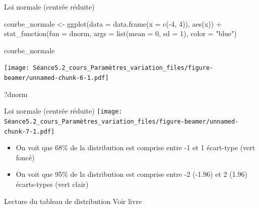 \documentclass[
  ignorenonframetext,
]{beamer}
\newenvironment{Shaded}{\begin{snugshade}}{\end{snugshade}}
\newcommand{\AttributeTok}[1]{\textcolor[rgb]{0.77,0.63,0.00}{#1}}
\newcommand{\DecValTok}[1]{\textcolor[rgb]{0.00,0.00,0.81}{#1}}
\newcommand{\FunctionTok}[1]{\textcolor[rgb]{0.00,0.00,0.00}{#1}}
\newcommand{\NormalTok}[1]{#1}
\newcommand{\OtherTok}[1]{\textcolor[rgb]{0.56,0.35,0.01}{#1}}
\newcommand{\SpecialCharTok}[1]{\textcolor[rgb]{0.00,0.00,0.00}{#1}}
\newcommand{\StringTok}[1]{\textcolor[rgb]{0.31,0.60,0.02}{#1}}
\providecommand{\tightlist}{%
  \setlength{\itemsep}{0pt}\setlength{\parskip}{0pt}}
\begin{document}
\begin{frame}[fragile]{Loi normale (centrée réduite)}
\protect\hypertarget{loi-normale-centruxe9e-ruxe9duite-1}{}
\begin{Shaded}
\begin{Highlighting}[]
\NormalTok{courbe\_normale }\OtherTok{\textless{}{-}} 
  \FunctionTok{ggplot}\NormalTok{(}\AttributeTok{data =} \FunctionTok{data.frame}\NormalTok{(}\AttributeTok{x =} \FunctionTok{c}\NormalTok{(}\SpecialCharTok{{-}}\DecValTok{4}\NormalTok{, }\DecValTok{4}\NormalTok{)), }\FunctionTok{aes}\NormalTok{(x)) }\SpecialCharTok{+}
  \FunctionTok{stat\_function}\NormalTok{(}\AttributeTok{fun =}\NormalTok{ dnorm, }\AttributeTok{args =} \FunctionTok{list}\NormalTok{(}\AttributeTok{mean =} \DecValTok{0}\NormalTok{, }\AttributeTok{sd =} \DecValTok{1}\NormalTok{), }\AttributeTok{color =} \StringTok{"blue"}\NormalTok{) }

\NormalTok{courbe\_normale}
\end{Highlighting}
\end{Shaded}

\texttt{[image: Séance5.2\_cours\_Paramètres\_variation\_files/figure-beamer/unnamed-chunk-6-1.pdf]}

\begin{Shaded}
\begin{Highlighting}[]
\NormalTok{?dnorm}
\end{Highlighting}
\end{Shaded}
\end{frame}

\begin{frame}{Loi normale (centrée réduite)}
\protect\hypertarget{loi-normale-centruxe9e-ruxe9duite-2}{}
\texttt{[image: Séance5.2\_cours\_Paramètres\_variation\_files/figure-beamer/unnamed-chunk-7-1.pdf]}

\begin{itemize}
\tightlist
\item
  On voit que 68\% de la distribution est comprise entre -1 et 1
  écart-type (vert foncé)
\item
  On voit que 95\% de la distribution est comprise entre -2 (-1.96) et 2
  (1.96) écarts-types (vert clair)
\end{itemize}
\end{frame}

\begin{frame}{Lecture du tableau de distribution}
\protect\hypertarget{lecture-du-tableau-de-distribution}{}
Voir livre
\end{frame}
\end{document}
